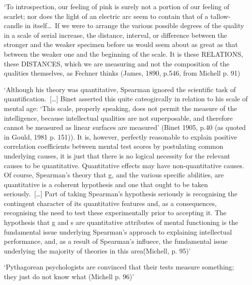 \documentclass[utf8]{FrontiersinVancouver}
\begin{document}
    `To introspection, our feeling of pink is surely not a portion of our feeling of scarlet; nor does the light of an electric arc seem to contain that of a tallow-candle in itself\ldots\ If we were to arrange the various possible degrees of the quality in a scale of serial increase, the distance, interval, or difference between the stronger and the weaker specimen before us would seem about as great as that between the weaker one and the beginning of the scale. It is these RELATIONS, these DISTANCES, which we are measuring and not the composition of the qualities themselves, as Fechner thinks (James, 1890, p.546, from Michell p. 91)

    `Although his theory was quantitative, Spearman ignored the scientific task of quantification.\ [\ldots] Binet asserted this quite cateogircally in relation to his scale of mental age: `This scale, properly speaking, does not permit the measure of the intelligence, because intellectual qualities are not superposable, and therefore cannot be measured as linear surfaces are measured' (Binet 1905, p.40 (as quoted in Gould, 1981 p. 151)). It is, however, perfectly reasonable to explain positive correlation coefficients between mental test scores by postulating common underlying causes, it is just that there is no logical necessity for the relevant causes to be quantitative. Quantitative effects may have non-quantitative causes. Of course, Spearman's theory that g, and the various specific abilities, are quantitative is a coherent hypothesis and one that ought to be taken seriously.\ [\ldots] Part of taking Spearman's hypothesis seriously is recognising the contingent character of its quantitative features and, as a consequences, recognising the need to test these experimentally prior to accepting it. The hypothesis that g and s are quantitative attributes of mental functioning is the fundamental issue underlying Spearman's approach to explaining intellectual performance, and, as a result of Spearman's influece, the fundamental issue underlying the majority of theories in this area\. (Michell, p. 95)'

    `Pythagorean psychologists are convinced that their tests measure something; they just do not know what (Michell p. 96)'
\end{document}
